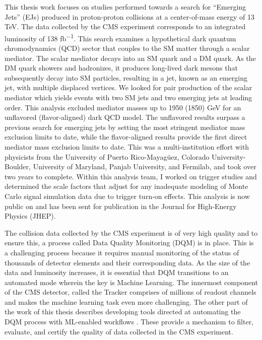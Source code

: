 This thesis work focuses on studies performed towards a search for ``Emerging Jets'' (EJs) produced in proton-proton collisions at a center-of-mass energy of 13 TeV. The data collected by the CMS experiment corresponds to an integrated luminosity of 138 \unit{fb^{-1}}. This search examines a hypothetical dark quantum chromodynamics (QCD) sector that couples to the SM matter through a scalar mediator. The scalar mediator decays into an SM quark and a DM quark. As the DM quark showers and hadronizes, it produces long-lived dark mesons that subsequently decay into SM particles, resulting in a jet, known as an emerging jet, with multiple displaced vertices. We looked for pair production of the scalar mediator which yields events with two SM jets and two emerging jets at leading order. This analysis \cite{CMS:2024gxp} excluded mediator masses up to 1950 (1850) GeV for an unflavored (flavor-aligned) dark QCD model. The unflavored results surpass a previous search for emerging jets \cite{sirunyan2019search} by setting the most stringent mediator mass exclusion limits to date, while the flavor-aligned results provide the first direct mediator mass exclusion limits to date.
This was a multi-institution effort with physicists from the University of Puerto Rico-Mayagüez, Colorado University-Boulder, University of Maryland, Panjab University, and Fermilab, and took over two years to complete. Within this analysis team, I worked on trigger studies and determined the scale factors that adjust for any inadequate modeling of Monte Carlo signal simulation data due to trigger turn-on effects. This analysis is now public on \cite{CMS:2024gxp} and has been sent for publication in the Journal for High-Energy Physics (JHEP).

The collision data collected by the CMS experiment is of very high quality and to ensure this, a process called Data Quality Monitoring (DQM) \cite{DeGuioDQM} is in place. This is a challenging process because it requires manual monitoring of the status of thousands of detector elements and their corresponding data.
As the size of the data and luminosity increases, it is essential that DQM transitions to an automated mode wherein the key is Machine Learning. The innermost component of the CMS detector, called the Tracker comprises of millions of readout channels and makes the machine learning task even more challenging. The other part of the work of this thesis describes developing tools directed at automating the DQM process with ML-enabled workflows \cite{Wachirapusitan_2023}. These provide a mechanism to filter, evaluate, and certify the quality of data collected in the CMS experiment.

